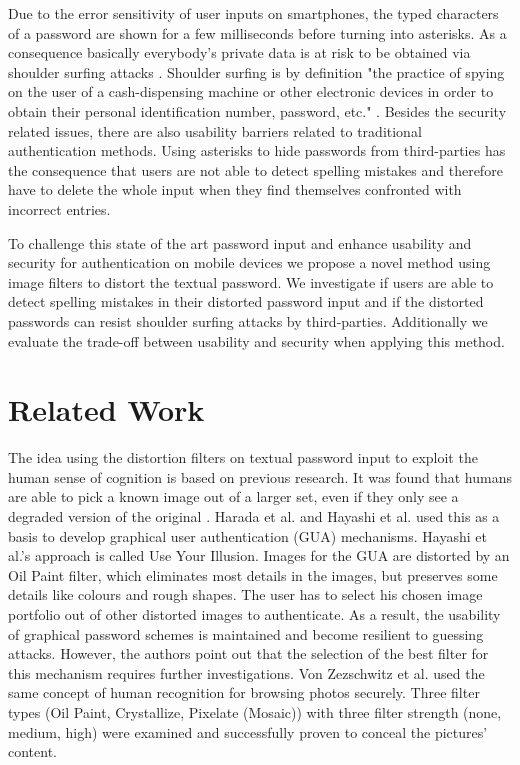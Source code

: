 \documentclass{sigchi}
\begin{document}
Due to the error sensitivity of user inputs on smartphones, the typed characters of a password are shown for a few milliseconds before turning into asterisks. As a consequence basically everybody's private data is at risk to be obtained via shoulder surfing attacks \cite{eiband2017understanding}. Shoulder surfing is by definition "the practice of spying on the user of a cash-dispensing machine or other electronic devices in order to obtain their personal identification number, password, etc." \cite{oxforddicshouldersurfing}.
Besides the security related issues, there are also usability barriers related to traditional authentication methods. Using asterisks to hide passwords from third-parties has the consequence  that users are not able to detect spelling mistakes and therefore have to delete the whole input when they find themselves confronted with incorrect entries.

To challenge this state of the art password input and enhance usability and security for authentication on mobile devices we propose a novel method using image filters to distort the textual password. We investigate if users are able to detect spelling mistakes in their distorted password input and if the distorted passwords can resist shoulder surfing attacks by third-parties. Additionally we evaluate the trade-off between usability and security when applying this method.



\section{Related Work}
The idea using the distortion filters on textual password input to exploit the human sense of cognition is based on previous research. It was found that humans are able to pick a known image out of a larger set, even if they only see a degraded version of the original \cite{burton1999face,gregory1997knowledge,kinjo2000does}.
Harada et al. \cite{harada2006user} and Hayashi et al. \cite{hayashi2008use} used this as a basis to develop graphical user authentication (GUA) mechanisms. Hayashi et al.'s approach is called Use Your Illusion. Images for the GUA are distorted by an Oil Paint filter, which eliminates most details in the images, but preserves some details like colours and rough shapes. The user has to select his chosen image portfolio out of other distorted images to authenticate. As a result, the usability of graphical password schemes is maintained and become resilient to guessing attacks. However, the authors point out that the selection of the best filter for this mechanism requires further investigations.
Von Zezschwitz et al. \cite{von2016you} used the same concept of human recognition for browsing photos securely. Three filter types (Oil Paint, Crystallize, Pixelate (Mosaic)) with three filter strength (none, medium, high) were examined and successfully proven to conceal the pictures’ content. 
\end{document}
